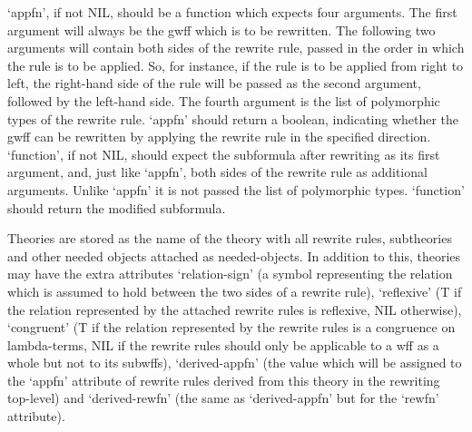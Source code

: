 `appfn', if not NIL, should be a function which expects four arguments.
The first argument will always be the gwff which is to be rewritten. The
following two arguments will contain both sides of the rewrite rule, passed
in the order in which the rule is to be applied. So, for instance, if the rule
is to be applied from right to left, the right-hand side of the rule will be
passed as the second argument, followed by the left-hand side. The fourth
argument is the list of polymorphic types of the rewrite rule.
`appfn' should return a boolean, indicating whether the gwff can be rewritten
by applying the rewrite rule in the specified direction.
`function', if not NIL, should expect the subformula after rewriting as its
first argument, and, just like `appfn', both sides of the rewrite rule as
additional arguments. Unlike `appfn' it is not passed the list of polymorphic
types. `function' should return the modified subformula.

Theories are
stored as the name of the theory with all rewrite rules, subtheories and other
needed objects attached as needed-objects. In addition to this, theories may
have the extra attributes `relation-sign' (a symbol representing the relation
which is assumed to hold between the two sides of a rewrite rule),
`reflexive' (T if the relation represented by the attached rewrite rules is
reflexive, NIL otherwise), `congruent' (T if the relation represented by
the rewrite rules is a congruence on lambda-terms, NIL if the rewrite rules
should only be applicable to a wff as a whole but not to its subwffs),
`derived-appfn' (the value which will be assigned to the `appfn' attribute of
rewrite rules derived from this theory in the rewriting top-level) and
`derived-rewfn' (the same as `derived-appfn' but for the `rewfn' attribute).

